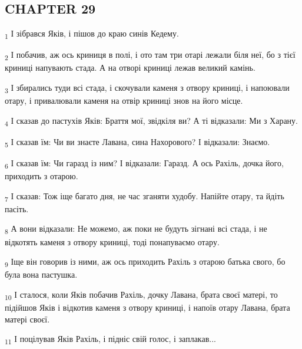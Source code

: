 \subsection{CHAPTER 29}
\begin{tcolorbox}
\textsubscript{1} І зібрався Яків, і пішов до краю синів Кедему.
\end{tcolorbox}
\begin{tcolorbox}
\textsubscript{2} І побачив, аж ось криниця в полі, і ото там три отарі лежали біля неї, бо з тієї криниці напувають стада. А на отворі криниці лежав великий камінь.
\end{tcolorbox}
\begin{tcolorbox}
\textsubscript{3} І збирались туди всі стада, і скочували каменя з отвору криниці, і напоювали отару, і привалювали каменя на отвір криниці знов на його місце.
\end{tcolorbox}
\begin{tcolorbox}
\textsubscript{4} І сказав до пастухів Яків: Браття мої, звідкіля ви? А ті відказали: Ми з Харану.
\end{tcolorbox}
\begin{tcolorbox}
\textsubscript{5} І сказав їм: Чи ви знаєте Лавана, сина Нахорового? І відказали: Знаємо.
\end{tcolorbox}
\begin{tcolorbox}
\textsubscript{6} І сказав їм: Чи гаразд із ним? І відказали: Гаразд. А ось Рахіль, дочка його, приходить з отарою.
\end{tcolorbox}
\begin{tcolorbox}
\textsubscript{7} І сказав: Тож іще багато дня, не час зганяти худобу. Напійте отару, та йдіть пасіть.
\end{tcolorbox}
\begin{tcolorbox}
\textsubscript{8} А вони відказали: Не можемо, аж поки не будуть зігнані всі стада, і не відкотять каменя з отвору криниці, тоді понапуваємо отару.
\end{tcolorbox}
\begin{tcolorbox}
\textsubscript{9} Іще він говорив із ними, аж ось приходить Рахіль з отарою батька свого, бо була вона пастушка.
\end{tcolorbox}
\begin{tcolorbox}
\textsubscript{10} І сталося, коли Яків побачив Рахіль, дочку Лавана, брата своєї матері, то підійшов Яків і відкотив каменя з отвору криниці, і напоїв отару Лавана, брата матері своєї.
\end{tcolorbox}
\begin{tcolorbox}
\textsubscript{11} І поцілував Яків Рахіль, і підніс свій голос, і заплакав...
\end{tcolorbox}
